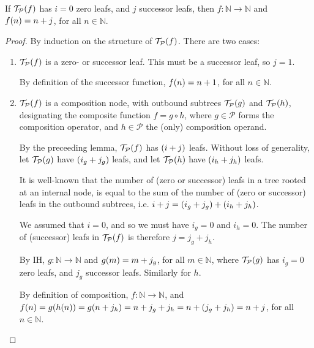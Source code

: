 \begin{lemma} \label{lem:p-no-zero} If $\mathcal{T}_\mathcal{P}{\mathopen{}\left({f}\right)\mathclose{}}$ has $i=0$
zero leafs, and $j$ successor leafs, then $f : \mathbb{N} \rightarrow
\mathbb{N}$ and $f{\mathopen{}\left({n}\right)\mathclose{}} = n + j$, for all $n \in \mathbb{N}$. \end{lemma}

\begin{proof} By induction on the structure of $\mathcal{T}_\mathcal{P}{\mathopen{}\left({f}\right)\mathclose{}}$.
There are two cases:\begin{enumerate}[label=(\arabic*)]

\item $\mathcal{T}_\mathcal{P}{\mathopen{}\left({f}\right)\mathclose{}}$ is a zero- or successor leaf. This must be
a successor leaf, so $j=1$.

By definition of the successor function, $f{\mathopen{}\left({n}\right)\mathclose{}} = n + 1$, for all $n \in
\mathbb{N}$.

\item $\mathcal{T}_\mathcal{P}{\mathopen{}\left({f}\right)\mathclose{}}$ is a composition node, with outbound
subtrees $\mathcal{T}_\mathcal{P}{\mathopen{}\left({g}\right)\mathclose{}}$ and $\mathcal{T}_\mathcal{P}{\mathopen{}\left({h}\right)\mathclose{}}$,
designating the composite function $f = g \circ h$, where $g \in \mathcal{P}$
forms the composition operator, and $h \in \mathcal{P}$ the (only) composition
operand.

By the preceeding lemma, $\mathcal{T}_\mathcal{P}{\mathopen{}\left({f}\right)\mathclose{}}$ has ${\mathopen{}\left({i+j}\right)\mathclose{}}$ leafs.
Without loss of generality, let $\mathcal{T}_\mathcal{P}{\mathopen{}\left({g}\right)\mathclose{}}$ have ${\mathopen{}\left({i_g +
j_g}\right)\mathclose{}}$ leafs, and let $\mathcal{T}_\mathcal{P}{\mathopen{}\left({h}\right)\mathclose{}}$ have ${\mathopen{}\left({i_h+j_h}\right)\mathclose{}}$ leafs.

It is well-known that the number of (zero or successor) leafs in a tree rooted
at an internal node, is equal to the sum of the number of (zero or successor)
leafs in the outbound subtrees, i.e. $i+j = {\mathopen{}\left({i_g + j_g}\right)\mathclose{}} + {\mathopen{}\left({i_h + j_h}\right)\mathclose{}}$.

We assumed that $i=0$, and so we must have $i_g=0$ and $i_h=0$. The number of
(successor) leafs in $\mathcal{T}_\mathcal{P}{\mathopen{}\left({f}\right)\mathclose{}}$ is therefore $j = j_g +
j_h$.

By IH, $g : \mathbb{N} \rightarrow \mathbb{N}$ and $g{\mathopen{}\left({m}\right)\mathclose{}} = m + j_g$, for all
$m \in \mathbb{N}$, where $\mathcal{T}_\mathcal{P}{\mathopen{}\left({g}\right)\mathclose{}}$ has $i_g = 0$ zero
leafs, and $j_g$ successor leafs. Similarly for $h$.

By definition of composition, $f : \mathbb{N} \rightarrow \mathbb{N}$, and
$f{\mathopen{}\left({n}\right)\mathclose{}}=g{\mathopen{}\left({h{\mathopen{}\left({n}\right)\mathclose{}}}\right)\mathclose{}} = g{\mathopen{}\left({n + j_h}\right)\mathclose{}} = n + j_g + j_h = n + {\mathopen{}\left({j_g + j_h}\right)\mathclose{}} = n +
j$, for all $n \in \mathbb{N}$.\end{enumerate}\end{proof}

